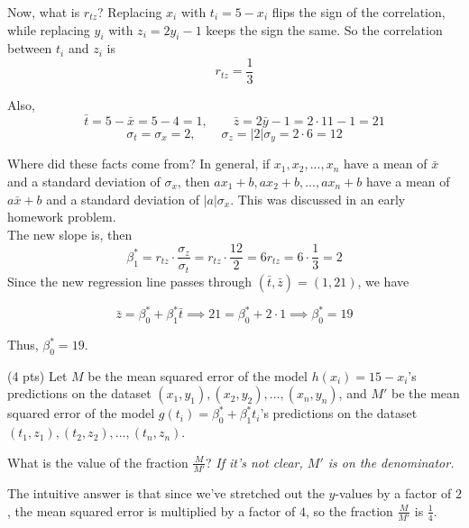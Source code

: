 \documentclass[11pt]{article}
\begin{document}
\begin{prob}
\begin{subprob}
\begin{solution}
Now, what is $r_{tz}$? Replacing $x_i$ with $t_i=5-x_i$ flips the sign of the correlation, while replacing $y_i$ with $z_i=2y_i-1$ keeps the sign the same. So the correlation between $t_i$ and $z_i$ is
\[
r_{tz} = \frac{1}{3}
\]

Also,
$$\bar t = 5-\bar x = 5 - 4 = 1,
\qquad
\bar z = 2\bar y - 1 = 2 \cdot 11 - 1 = 21$$
$$
\sigma_t = \sigma_x = 2,
\qquad
\sigma_z = |2| \sigma_y = 2 \cdot 6 = 12
$$

Where did these facts come from? In general, if $x_1, x_2, ..., x_n$ have a mean of $\bar x$ and a standard deviation of $\sigma_x$, then $a x_1 + b, a x_2 + b, ..., a x_n + b$ have a mean of $a \bar x + b$ and a standard deviation of $|a| \sigma_x$. This was discussed in an early homework problem. \\

The new slope is, then
\[
\beta_1^* = r_{tz} \cdot \frac{\sigma_z}{\sigma_t} = r_{tz} \cdot \frac{12}{2} = 6 r_{tz} = 6 \cdot \frac{1}{3} = 2
\]
Since the new regression line passes through $(\bar t,\bar z) = (1, 21)$, we have

$$\bar z = \beta_0^* + \beta_1^* \bar t \implies 21 = \beta_0^* + 2 \cdot 1 \implies \beta_0^* = 19$$

Thus, $\boxed{\beta_0^* = 19}$.
\end{solution}
\end{subprob}

\begin{subprob}(4 pts) Let $M$ be the mean squared error of the model $h(x_i) = 15 - x_i$'s predictions on the dataset $(x_1, y_1), (x_2, y_2), \ldots, (x_n, y_n)$, and
$M'$ be the mean squared error of the model $g(t_i) = \beta_0^* + \beta_1^* t_i$'s predictions on the dataset $(t_1, z_1), (t_2, z_2), \ldots, (t_n, z_n)$.

\vspace{0.1in}

What is the value of the fraction $\frac{M}{M'}$? \textit{If it's not clear, $M'$ is on the denominator.} \\

       

\begin{solution}
The intuitive answer is that since we've stretched out the $y$-values by a factor of $2$, the mean squared error is multiplied by a factor of $4$, so the fraction $\frac{M}{M'}$ is $\frac{1}{4}$.


\end{solution}
\end{subprob}
\end{prob}
\end{document}
